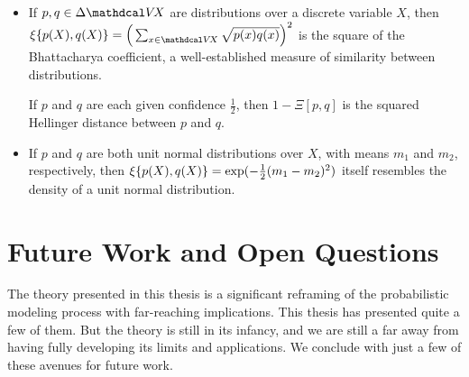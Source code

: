 \begin{itemize}
    \item If $p, q \in \Delta \V\!X$ are distributions over a discrete variable $X$, then
        $\selfconsist\{ p(X), q(X)\} = \Big( \sum_{x \in \V\!X} \sqrt{p(x) q(x)} \Big)^2$ is the square of the Bhattacharya coefficient, a well-established measure of similarity between distributions. 
        
        If $p$ and $q$ are each given confidence $\frac12$, then $1-\Xi[p,q]$ is the squared Hellinger distance between $p$ and $q$. 

    \item 
        If $p$ and $q$ are both unit normal distributions over $X$, 
        with means $m_1$ and $m_2$, respectively, then
        $\xi\{ p(X), q(X) \} = \exp( - \frac12 (m_1 - m_2)^2)$
        itself resembles the density of a unit normal distribution.        
\end{itemize}


\section{Future Work and Open Questions}

The theory presented in this thesis is a significant reframing of the probabilistic modeling process with far-reaching implications.
This thesis has presented quite a few of them. 
But the theory is still in its infancy, 
    and we are still a far away from having fully developing its limits and applications. 
We conclude with just a few of these avenues for future work.

